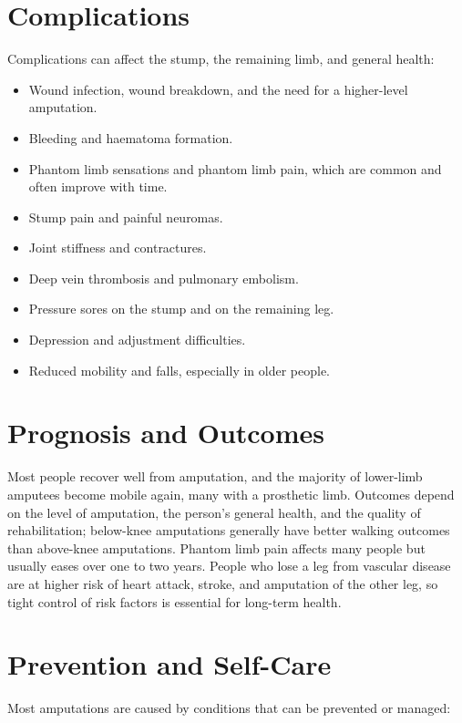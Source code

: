 \section*{Complications}
Complications can affect the stump, the remaining limb, and general health:

\begin{itemize}
    \item Wound infection, wound breakdown, and the need for a higher-level amputation.
    \item Bleeding and haematoma formation.
    \item Phantom limb sensations and phantom limb pain, which are common and often improve with time.
    \item Stump pain and painful neuromas.
    \item Joint stiffness and contractures.
    \item Deep vein thrombosis and pulmonary embolism.
    \item Pressure sores on the stump and on the remaining leg.
    \item Depression and adjustment difficulties.
    \item Reduced mobility and falls, especially in older people.
\end{itemize}

\section*{Prognosis and Outcomes}
Most people recover well from amputation, and the majority of lower-limb amputees become mobile again, many with a prosthetic limb. Outcomes depend on the level of amputation, the person's general health, and the quality of rehabilitation; below-knee amputations generally have better walking outcomes than above-knee amputations. Phantom limb pain affects many people but usually eases over one to two years. People who lose a leg from vascular disease are at higher risk of heart attack, stroke, and amputation of the other leg, so tight control of risk factors is essential for long-term health.

\section*{Prevention and Self-Care}
Most amputations are caused by conditions that can be prevented or managed:

